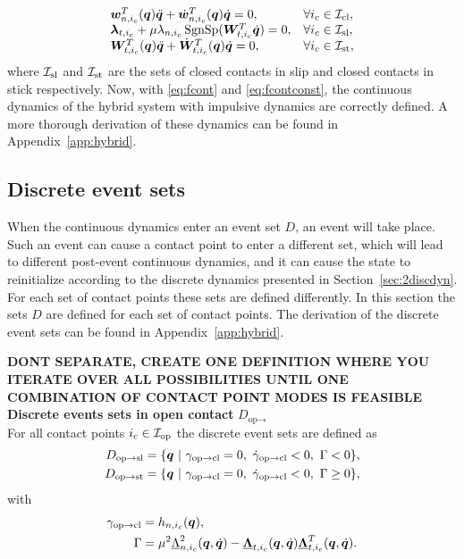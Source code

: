 \documentclass[../DC2017114Bouma.tex]{subfiles}
\begin{document}
\begin{equation}
\begin{array}{ll}
{\boldsymbol{w}}^T_{n,i_c}({\boldsymbol{q}})\ddot{{\boldsymbol{q}}} + \dot{{\boldsymbol{w}}}^T_{n,i_c}({\boldsymbol{q}})\dot{{\boldsymbol{q}}} = 0, & \forall i_c\in\mathcal{I}_{\text{cl}},\\
\boldsymbol{\lambda}_{t,i_c} + \mu\lambda_{n,i_c}\operatorname{\text{SgnSp}}({\boldsymbol{W}}_{t,i_c}^T\dot{{\boldsymbol{q}}}) = 0, & \forall i_c\in\mathcal{I}_{\text{sl}},\\
{\boldsymbol{W}}^T_{t,i_c}({\boldsymbol{q}})\ddot{{\boldsymbol{q}}} + \dot{{\boldsymbol{W}}}^T_{t,i_c}({\boldsymbol{q}})\dot{{\boldsymbol{q}}} = 0, & \forall i_c\in\mathcal{I}_{\text{st}},
\end{array}\label{eq:fcontconst}
\end{equation}
where $\mathcal{I}_{\text{sl}}$ and $\mathcal{I}_{\text{st}}$ are the sets of closed contacts in slip and closed contacts in stick respectively. Now, with \eqref{eq:fcont} and \eqref{eq:fcontconst}, the continuous dynamics of the hybrid system with impulsive dynamics are correctly defined. A more thorough derivation of these dynamics can be found in Appendix~\ref{app:hybrid}.

\subsection{Discrete event sets}\label{sec:2event}
When the continuous dynamics enter an event set $D$, an event will take place. Such an event can cause a contact point to enter a different set, which will lead to different post-event continuous dynamics, and it can cause the state to reinitialize according to the discrete dynamics presented in Section~\ref{sec:2discdyn}. For each set of contact points these sets are defined differently. In this section the sets $D$ are defined for each set of contact points. The derivation of the discrete event sets can be found in Appendix~\ref{app:hybrid}.

\textbf{DONT SEPARATE, CREATE ONE DEFINITION WHERE YOU ITERATE OVER ALL POSSIBILITIES UNTIL ONE COMBINATION OF CONTACT POINT MODES IS FEASIBLE}\\
\textbf{Discrete events sets in open contact} $D_{\text{op}\rightarrow}$\\
For all contact points $i_c\in\mathcal{I}_{\text{op}}$ the discrete event sets are defined as
\begin{align}
D_{\text{op}\rightarrow\text{sl}} &= \{ \qb\ |\ \gamma_{\text{op}\rightarrow\text{cl}} = 0,\ \dot{\gamma}_{\text{op}\rightarrow\text{cl}} < 0,\ \Gamma < 0 \},\\
D_{\text{op}\rightarrow\text{st}} &= \{ \qb\ |\ \gamma_{\text{op}\rightarrow\text{cl}} = 0,\ \dot{\gamma}_{\text{op}\rightarrow\text{cl}} < 0,\ \Gamma \geq 0 \},
\end{align}
with
\begin{align}
\gamma_{\text{op}\rightarrow\text{cl}} &= h_{n,i_c}({\boldsymbol{q}}),\\
\Gamma &= \mu^2\underline{\Lambda}^2_{n,i_c}({\boldsymbol{q}},\dot{{\boldsymbol{q}}})-\underline{\boldsymbol{\Lambda}}_{t,i_c}({\boldsymbol{q}},\dot{{\boldsymbol{q}}})\underline{\boldsymbol{\Lambda}}^T_{t,i_c}({\boldsymbol{q}},\dot{{\boldsymbol{q}}}).
\end{align}
\end{document}
